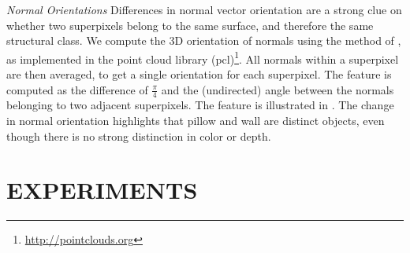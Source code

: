 \documentclass[a4paper, 10pt, conference]{ieeeconf}      %
\begin{document}
\emph{Normal Orientations}
    Differences in normal vector orientation are a strong clue on
    whether two superpixels belong to the same surface, and therefore the
    same structural class.
    We compute the 3D orientation of normals using the method of \citet{holz_2011_robocup},
    as implemented in the point cloud library (pcl)\footnote{\url{http://pointclouds.org}}.
    All normals within a superpixel are then averaged, to get a single orientation for each superpixel.
    The feature is computed as the difference of $\frac{\pi}{4}$ and the (undirected) angle between the normals belonging
    to two adjacent superpixels.  
    The feature is illustrated in . The change
    in normal orientation highlights that pillow and wall are distinct
    objects, even though there is no strong distinction in color or depth.


\section{EXPERIMENTS}
\end{document}
